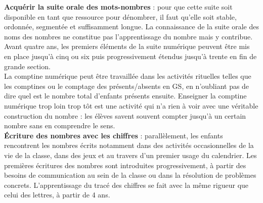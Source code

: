    {\bf Acquérir la suite orale des mots-nombres} : pour que cette suite soit disponible en tant que ressource pour dénombrer, il faut qu’elle soit stable, ordonnée, segmentée et suffisamment longue. La connaissance de la suite orale des noms des nombres ne constitue pas l’apprentissage du nombre mais y contribue.
Avant quatre ans, les premiers éléments de la suite numérique peuvent être mis en place jusqu’à cinq ou six puis progressivement étendus jusqu’à trente en fin de grande section. \\
   La comptine numérique peut être travaillée dans les activités rituelles telles que les comptines ou le comptage des présents/absents en GS, en n'oubliant pas de dire quel est le nombre total d'enfants présents ensuite. Enseigner la comptine numérique trop loin trop tôt est une activité qui n'a rien à voir avec une véritable construction du nombre : les élèves savent souvent \og compter \fg{} jusqu'à un certain nombre sans en comprendre le sens. \\
   
   {\bf Écriture des nombres avec les chiffres} : parallèlement, les enfants rencontrent les nombres écrits notamment dans des activités occasionnelles de la vie de la classe, dans des jeux et au travers d’un premier usage du calendrier. Les premières écritures des nombres sont introduites progressivement, à partir des besoins de communication au sein de la classe ou dans la résolution de problèmes concrets. L’apprentissage du tracé des chiffres se fait avec la même rigueur que celui des lettres, à partir de 4 ans.

